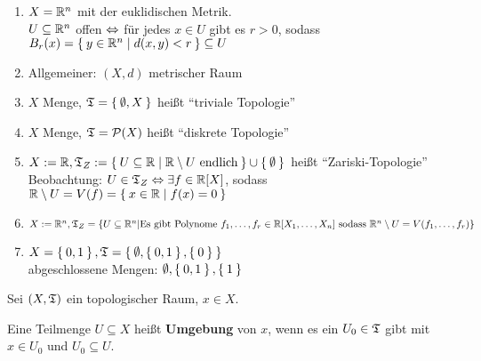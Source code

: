 \begin{beispiel}
    \begin{enumerate}[1)]
        \item $X = \mathbb{R}^n$ mit der euklidischen Metrik.\\
              $U \subseteq \mathbb{R}^n$ offen $\Leftrightarrow$ für jedes $x \in U$ 
              gibt es $r > 0$, sodass $B_r(x) = \Set{y \in \ensuremath{\mathbb{R}}^n | d(x,y) < r} \subseteq U$
        \item Allgemeiner: $(X, d)$ metrischer Raum
        \item $X$ Menge, $\mathfrak{T} = \Set{\emptyset, X}$ heißt \enquote{triviale Topologie} 
        \item $X$ Menge, $\mathfrak{T} = \mathcal{P}(X)$ heißt \enquote{diskrete Topologie} 
        \item $X :=\mathbb{R}, \mathfrak{T}_Z := \Set{U \subseteq \ensuremath{\mathbb{R}}| \ensuremath{\mathbb{R}}\setminus U \text{ endlich}} \cup \Set{\emptyset}$ heißt \enquote{Zariski-Topologie} \\
              Beobachtung: $U \in \mathfrak{T}_Z \Leftrightarrow \exists f \in \mathbb{R}[X]$, sodass $\mathbb{R} \setminus U = V(f) = \Set{x \in \ensuremath{\mathbb{R}}| f(x) = 0}$
        \item $X := \mathbb{R}^n, \mathfrak{T}_Z = \{U \subseteq \mathbb{R}^n | \text{Es gibt Polynome } f_1, \dots, f_r \in \mathbb{R}[X_1, \dots, X_n] \text{ sodass }\\\mathbb{R}^n \setminus U = V(f_1, \dots, f_r)\}$
        \item $X = \Set{0,1}, \mathfrak{T} = \Set{\emptyset, \Set{0,1}, \Set{0}}$\\
              abgeschlossene Mengen: $\emptyset, \Set{0,1}, \Set{1}$
    \end{enumerate}
\end{beispiel}

\begin{definition} 
    Sei $(X, \mathfrak{T})$ ein topologischer Raum, $x \in X$.

    Eine Teilmenge $U \subseteq X$ heißt \textbf{Umgebung} von $x$,
    wenn es ein $U_0 \in \mathfrak{T}$ gibt mit $x \in U_0$ und $U_0 \subseteq U$.
\end{definition}

